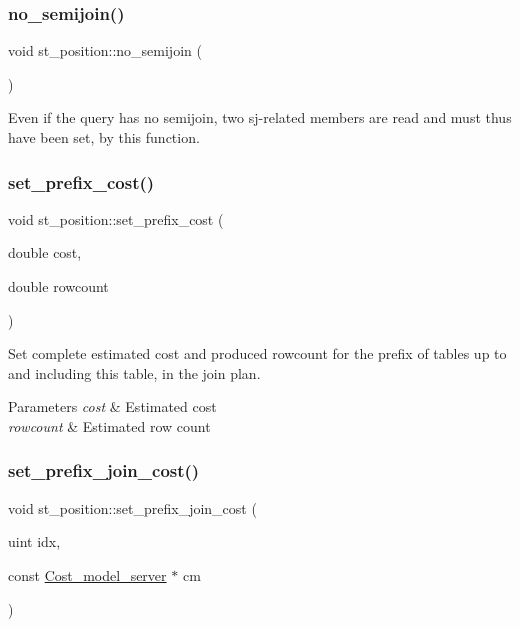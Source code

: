 \subsubsection{\texorpdfstring{no\+\_\+semijoin()}{no\_semijoin()}}
{\footnotesize\ttfamily void st\+\_\+position\+::no\+\_\+semijoin (\begin{DoxyParamCaption}{ }\end{DoxyParamCaption})\hspace{0.3cm}{\ttfamily [inline]}}

Even if the query has no semijoin, two sj-\/related members are read and must thus have been set, by this function. \mbox{\label{structst__position_aa317ac2b3fa373e6c8f9a1a02c2e2754}} 
\subsubsection{\texorpdfstring{set\+\_\+prefix\+\_\+cost()}{set\_prefix\_cost()}}
{\footnotesize\ttfamily void st\+\_\+position\+::set\+\_\+prefix\+\_\+cost (\begin{DoxyParamCaption}\item[{double}]{cost,  }\item[{double}]{rowcount }\end{DoxyParamCaption})\hspace{0.3cm}{\ttfamily [inline]}}

Set complete estimated cost and produced rowcount for the prefix of tables up to and including this table, in the join plan.


\begin{DoxyParams}{Parameters}
{\em cost} & Estimated cost \\
\hline
{\em rowcount} & Estimated row count \\
\hline
\end{DoxyParams}
\mbox{\label{structst__position_a3077a39535d27d819e8e027e22905840}} 
\subsubsection{\texorpdfstring{set\+\_\+prefix\+\_\+join\+\_\+cost()}{set\_prefix\_join\_cost()}}
{\footnotesize\ttfamily void st\+\_\+position\+::set\+\_\+prefix\+\_\+join\+\_\+cost (\begin{DoxyParamCaption}\item[{uint}]{idx,  }\item[{const \mbox{\hyperlink{classCost__model__server}{Cost\+\_\+model\+\_\+server}} $\ast$}]{cm }\end{DoxyParamCaption})\hspace{0.3cm}{\ttfamily [inline]}}

